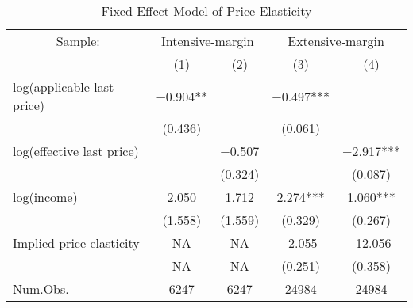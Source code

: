 \begin{table}

\caption{Fixed Effect Model of Price Elasticity \label{tab:fe-model}}
\centering
\begin{tabular}[t]{lcccc}
\toprule
\multicolumn{1}{c}{Sample:} & \multicolumn{2}{c}{Intensive-margin} & \multicolumn{2}{c}{Extensive-margin} \\
\cmidrule(l{3pt}r{3pt}){1-1} \cmidrule(l{3pt}r{3pt}){2-3} \cmidrule(l{3pt}r{3pt}){4-5}
  & (1) & (2) & (3) & (4)\\
\midrule
log(applicable last price) & \num{-0.904}** &  & \num{-0.497}*** & \\
 & (\num{0.436}) &  & (\num{0.061}) & \\
log(effective last price) &  & \num{-0.507} &  & \num{-2.917}***\\
 &  & (\num{0.324}) &  & (\num{0.087})\\
log(income) & \num{2.050} & \num{1.712} & \num{2.274}*** & \num{1.060}***\\
 & (\num{1.558}) & (\num{1.559}) & (\num{0.329}) & (\num{0.267})\\
\midrule
Implied price elasticity & \num{NA} & \num{NA} & -2.055 & -12.056\\
 & \num{NA} & \num{NA} & (0.251) & (0.358)\\
Num.Obs. & \num{6247} & \num{6247} & \num{24984} & \num{24984}\\
\bottomrule
\end{tabular}
\end{table}
